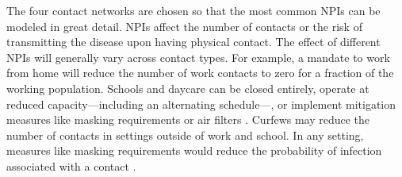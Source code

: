 The four contact networks are chosen so that the most common NPIs can be modeled in
great detail. NPIs affect the number of contacts or the risk of transmitting the disease
upon having physical contact. The effect of different NPIs will generally vary across
contact types. For example, a mandate to work from
home will reduce the number of work contacts to zero for a fraction of the working
population. Schools and daycare can be closed entirely, operate at reduced
capacity---including an alternating schedule---, or implement mitigation measures like
masking requirements or air filters \citep{Lessler2021}. Curfews may reduce the number
of contacts in settings outside of
work and school. In any setting, measures like masking requirements would reduce the
probability of infection associated with a contact
\citep{Cheng2021}.

